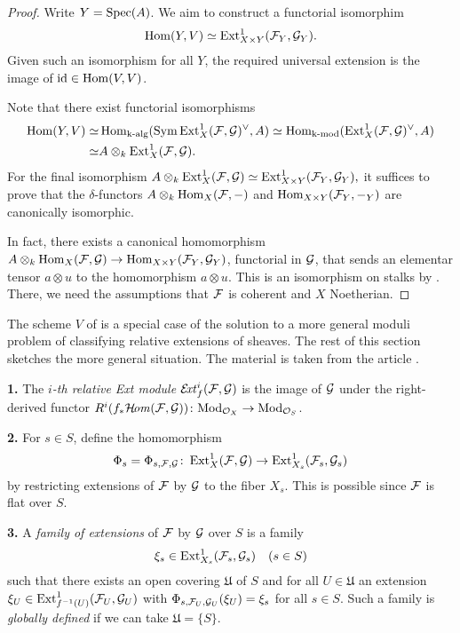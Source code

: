 \begin{proof}
Write $Y=\operatorname{Spec}(A)$. We aim to construct a functorial isomorphim
\[
\operatorname{Hom}(Y,V)\simeq \operatorname{Ext}^1_{X\times Y}(\mathcal{F}_Y, \mathcal{G}_Y).
\]
Given such an isomorphism for all $Y$, the required universal extension is the image of $\operatorname{id}\in\operatorname{Hom}(V,V)$.

Note that there exist functorial isomorphisms
\begin{align*}
\operatorname{Hom}(Y,V)
\simeq & \operatorname{Hom}_{\text{k-alg}}(\operatorname{Sym}\operatorname{Ext}^1_X(\mathcal{F},\mathcal{G})^\vee,A) 
\simeq \operatorname{Hom}_{\text{k-mod}}(\operatorname{Ext}^1_X(\mathcal{F},\mathcal{G})^\vee,A) \\
\simeq & A \otimes_k \operatorname{Ext}^1_{X}(\mathcal{F},\mathcal{G}).
\end{align*}
For the final isomorphism
$A \otimes_k \operatorname{Ext}^1_{X}(\mathcal{F},\mathcal{G})\simeq
\operatorname{Ext}^1_{X\times Y}(\mathcal{F}_Y,\mathcal{G}_Y),$
it suffices to prove that the $\delta$-functors\footnotemark{} $A\otimes_k \operatorname{Hom}_X(\mathcal{F},-)$ and
$\operatorname{Hom}_{X\times Y}(\mathcal{F}_Y, {-}_Y)$ are canonically isomorphic.


In fact, there exists a canonical homomorphism $A\otimes_k \operatorname{Hom}_X(\mathcal{F},\mathcal{G}) \to\operatorname{Hom}_{X\times Y}(\mathcal{F}_Y, {\mathcal{G}}_Y)$, functorial in $\mathcal{G}$, that sends an elementar tensor $a \otimes u$ to the homomorphism $a\otimes u$. This is an isomorphism on stalks by
\cite[Ch.\ \textsc{I}, \S 2.10]{bourbaki-commutative-algebra}.
There, we need the assumptions that $\mathcal{F}$ is coherent and $X$ Noetherian. 
\end{proof}

The scheme $V$ of  is a special case of the solution to a more general moduli problem of classifying relative extensions of sheaves. The rest of this section sketches the more general situation. The material is taken from the article \cite{lange-universal-extensions}.

\begin{definition}
	\textbf{1.} The \emph{$i$-th relative Ext module} $\mathcal{E}\!\mathit{xt}^i_f(\mathcal{F},\mathcal{G})$ is the image of $\mathcal{G}$ under the right-derived functor
	$R^i(f_{*}\mathcal{H}\!\mathit{om}(\mathcal{F},\mathcal{G}))
	\colon \mathrm{Mod}_{\mathcal{O}_X} \to \mathrm{Mod}_{\mathcal{O}_S}$.

	\textbf{2.} For $s\in S$, define the homomorphism
	\[
		\Phi_s = \Phi_{s,\mathcal{F},\mathcal{G}}
		\colon \operatorname{Ext}^1_X(\mathcal{F},\mathcal{G})
		\to \operatorname{Ext}^1_{X_s}(\mathcal{F}_s, \mathcal{G}_s)
	\]
	by restricting extensions of $\mathcal{F}$ by $\mathcal{G}$ to the fiber $X_s$. This is possible since $\mathcal{F}$ is flat over $S$.

	\textbf{3.} A \emph{family of extensions} of $\mathcal{F}$ by $\mathcal{G}$ over $S$ is a family
	\[
		\xi_s \in \operatorname{Ext}^1_{X_s}(\mathcal{F}_s,\mathcal{G}_s) \quad (s\in S)
	\]
	such that there exists an open covering $\mathfrak{U}$ of $S$ and for all $U\in \mathfrak{U}$ an extension $\xi_U \in \operatorname{Ext}^1_{f^{-1}(U)}(\mathcal{F}_U,\mathcal{G}_U)$
	with $\Phi_{s,\mathcal{F}_U,\mathcal{G}_U}(\xi_U) = \xi_s$ for all $s\in S$.
	Such a family is \emph{globally defined} if we can take $\mathfrak{U} = \{S\}$.
\end{definition}

